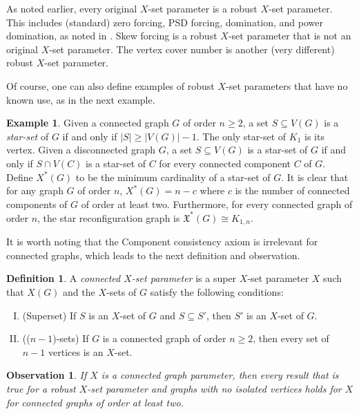 \documentclass{article}
\numberwithin{figure}{section}
\numberwithin{table}{section}
\numberwithin{equation}{section}
\newtheorem{obs}[thm]{Observation}
\theoremstyle{definition}
\theoremstyle{definition}
\newtheorem{defn}[thm]{Definition}
\theoremstyle{definition}
\newtheorem{ex}[thm]{Example}
\newcommand{\ben}{\begin{enumerate}}
\newcommand{\een}{\end{enumerate}}
\newcommand{\Xc}{X}
\newcommand{\Xr}{X}
\newcommand{\X}{\mathfrak{X}}
\begin{document}
{ 
 As noted earlier, every original $X$-set parameter is a robust $X$-set parameter. This includes (standard) zero forcing, PSD forcing, domination, and power domination, as noted in \cite{XTARiso}. Skew forcing is a robust $X$-set parameter that is not an original $X$-set parameter. The vertex cover number is another (very different) robust $X$-set parameter.



Of course, one can also define examples of robust $X$-set parameters that have no known use, as in the next example.

\begin{ex}
    Given a connected graph $G$ of order $n\ge 2$, a set $S\subseteq V(G)$ is a  \emph{star-set} of $G$ 
    if and only if $|S|\ge |V(G)|-1$.  The only star-set of $K_1$ is its vertex. Given a disconnected graph $G$, a set $S\subseteq V(G)$ is a star-set of $G$ if and only if $S\cap V(C)$ is a star-set of $C$ for every connected component $C$ of $G$. Define $X^*(G)$ to be the minimum cardinality of a star-set of $G$.  It is clear that for any graph $G$ of order $n$, $X^*(G)=n-c$ where $c$ is the number of connected components of $G$ of order at least two.  Furthermore, for every connected graph of order $n$, the star reconfiguration graph is $\X^*(G)\cong K_{1,n}$.
\end{ex}


 It is worth noting that 
the Component consistency axiom is irrelevant for connected graphs, which leads to the next definition and observation.

 \begin{defn}\label{Connected-parameters}
  A \emph{connected $X$-set parameter} is a super $X$-set parameter $X$  such that $X(G)$ and  the $X$-sets of $G$ satisfy the following conditions:  
\ben[(I)]
\item (Superset)
If $S$ is an $\Xc$-set of  $G$ and  $S\subseteq S'$, then $S'$ is an $\Xr$-set of $G$.

\item  (($n-1$)-sets) If $G$ is a connected graph of order  $n\ge 2$, then every set of $ n-1$ vertices is an $\Xr$-set. 
\een  
\end{defn}

 

\begin{obs}\label{r:component}  
If $\Xc$ is a connected graph parameter, 
then every result that is true for a robust $X$-set parameter and graphs with no isolated vertices holds for $\Xc$ for connected graphs  of order at least two. 
\end{obs}

}
\end{document}
